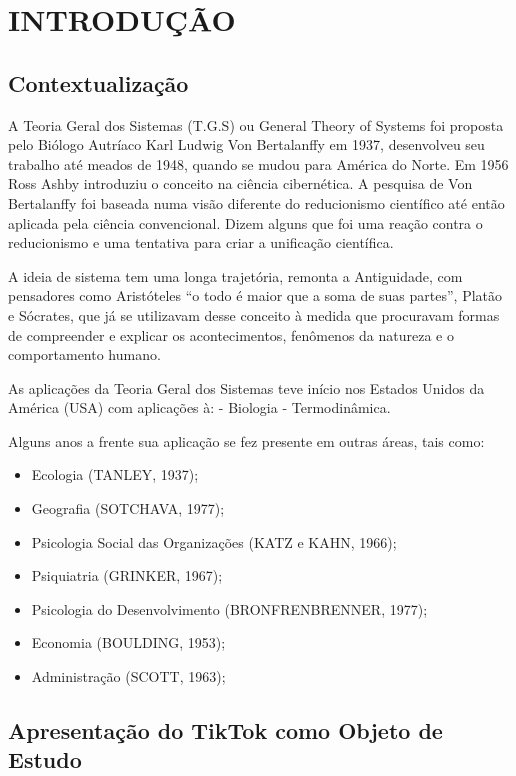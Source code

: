 \section{INTRODUÇÃO}
\subsection{Contextualização}

A Teoria Geral dos Sistemas (T.G.S) ou General Theory of Systems foi proposta pelo Biólogo Autríaco Karl Ludwig Von Bertalanffy em 1937, desenvolveu seu trabalho até meados de 1948, quando se mudou para América do Norte. Em 1956 Ross Ashby introduziu o conceito na ciência cibernética. A pesquisa de Von Bertalanffy foi baseada numa visão diferente do reducionismo científico até então aplicada pela ciência convencional. Dizem alguns que foi uma reação contra o reducionismo e uma tentativa para criar a unificação científica.\vskip0.3cm

A ideia de sistema tem uma longa trajetória, remonta a Antiguidade, com pensadores como Aristóteles “o todo é maior que a soma de suas partes”, Platão e Sócrates, que já se utilizavam desse conceito à medida que procuravam formas de compreender e explicar os acontecimentos, fenômenos da natureza e o comportamento humano.\vskip0.3cm

As aplicações da Teoria Geral dos Sistemas teve início nos Estados Unidos da América (USA) com aplicações à: - Biologia - Termodinâmica.\vskip0.3cm

Alguns anos a frente sua aplicação se fez presente em outras áreas, tais como:

\begin{itemize}
    \item Ecologia (TANLEY, 1937);
    \item Geografia (SOTCHAVA, 1977);
    \item Psicologia Social das Organizações (KATZ e KAHN, 1966);
    \item Psiquiatria (GRINKER, 1967);
    \item Psicologia do Desenvolvimento (BRONFRENBRENNER, 1977);
    \item Economia (BOULDING, 1953);
    \item Administração (SCOTT, 1963);
\end{itemize}

\newpage
\subsection{Apresentação do TikTok como Objeto de Estudo}

